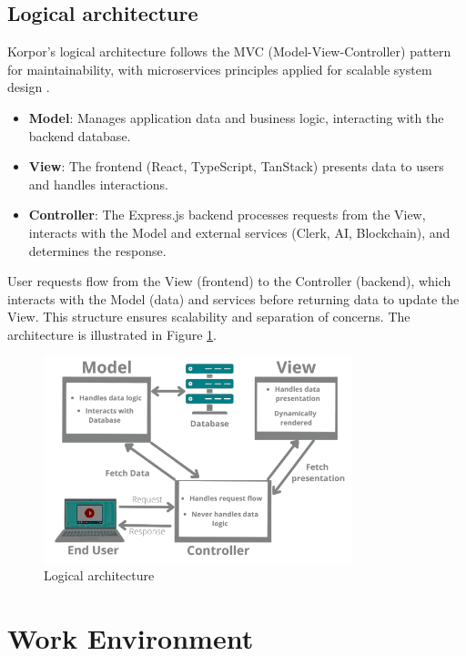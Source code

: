 \subsection{Logical architecture}

Korpor's logical architecture follows the MVC (Model-View-Controller) pattern \cite{SunardiMVC2019, GammaPatterns1994} for maintainability, with microservices principles applied for scalable system design \cite{NewmanMicroservices2021}.
\begin{itemize}
    \item \textbf{Model}: Manages application data and business logic, interacting with the backend database.
    \item \textbf{View}: The frontend (React, TypeScript, TanStack) presents data to users and handles interactions.
    \item \textbf{Controller}: The Express.js backend processes requests from the View, interacts with the Model and external services (Clerk, AI, Blockchain), and determines the response.
\end{itemize}
User requests flow from the View (frontend) to the Controller (backend), which interacts with the Model (data) and services before returning data to update the View. This structure ensures scalability and separation of concerns. The architecture is illustrated in Figure \ref{fig:logical-architecture}.

\begin{figure}[htbp]
    \centering
    \includegraphics[width=0.8\textwidth]{images/logique.png}
    \caption{Logical architecture}
    \label{fig:logical-architecture}
\end{figure}

\section{Work Environment}

